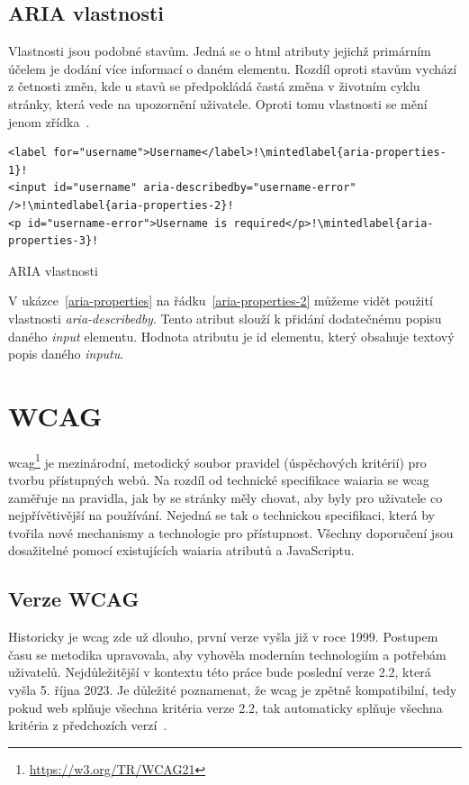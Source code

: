 \subsection{ARIA vlastnosti}

Vlastnosti jsou podobné stavům.
Jedná se o \gls{html} atributy jejichž primárním účelem je dodání více informací o daném elementu.
Rozdíl oproti stavům vychází z četnosti změn, kde u stavů se předpokládá častá změna v životním cyklu stránky, která vede na upozornění uživatele.
Oproti tomu vlastnosti se mění jenom zřídka~\cite[sekce 6.1]{wai-aria}.

\begin{listing}[!ht]
    \begin{verbatim}
<label for="username">Username</label>!\mintedlabel{aria-properties-1}!
<input id="username" aria-describedby="username-error" />!\mintedlabel{aria-properties-2}!
<p id="username-error">Username is required</p>!\mintedlabel{aria-properties-3}!
\end{verbatim}
    \caption{ARIA vlastnosti}
    \label{aria-properties}
\end{listing}

V ukázce~\ref{aria-properties} na řádku~\ref{aria-properties-2} můžeme vidět použití vlastnosti \textit{aria-describedby}.
Tento atribut slouží k přidání dodatečnému popisu daného \textit{input} elementu. Hodnota atributu je id elementu, který obsahuje textový popis daného \textit{inputu}.

\section{WCAG}

\gls{wcag}\footnote{\url{https://w3.org/TR/WCAG21}} je mezinárodní, metodický soubor pravidel (úspěchových kritérií) pro tvorbu přístupných webů.
Na rozdíl od technické specifikace \gls{waiaria} se \gls{wcag} zaměřuje na pravidla, jak by se stránky měly chovat, aby byly pro uživatele co nejpřívětivější na používání.
Nejedná se tak o technickou specifikaci, která by tvořila nové mechanismy a technologie pro přístupnost.
Všechny doporučení jsou dosažitelné pomocí existujících \gls{waiaria} atributů a JavaScriptu.

\subsection{Verze WCAG}

Historicky je \gls{wcag} zde už dlouho, první verze vyšla již v roce 1999.
Postupem času se metodika upravovala, aby vyhověla moderním technologiím a potřebám uživatelů.
Nejdůležitější v kontextu této práce bude poslední verze 2.2, která vyšla 5. října 2023.
Je důležité poznamenat, že \gls{wcag} je zpětně kompatibilní, tedy pokud web splňuje všechna kritéria verze 2.2, tak automaticky splňuje všechna kritéria z předchozích verzí~\cite{wcag}.


